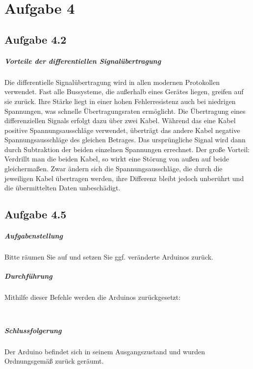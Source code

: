 \chapter{Aufgabe 4}
\section{Aufgabe 4.2}
\paragraph{Vorteile der differentiellen Signalübertragung}
Die differentielle Signalübertragung wird in allen modernen Protokollen verwendet. Fast alle Bussysteme, die außerhalb eines Gerätes liegen, greifen auf sie zurück. Ihre Stärke liegt in einer hohen Fehlerresistenz auch bei niedrigen Spannungen, was schnelle Übertragungsraten ermöglicht. Die Übertragung eines differenziellen Signals erfolgt dazu über zwei Kabel. Während das eine Kabel positive Spannungsausschläge verwendet, überträgt das andere Kabel negative Spannungsausschläge des gleichen Betrages. Das ursprüngliche Signal wird dann durch Subtraktion der beiden einzelnen Spannungen errechnet. Der große Vorteil: Verdrillt man die beiden Kabel, so wirkt eine Störung von außen auf beide gleichermaßen. Zwar ändern sich die Spannungsausschläge, die durch die jeweiligen Kabel übertragen werden, ihre Differenz bleibt jedoch unberührt und die übermittelten Daten unbeschädigt.




\section{Aufgabe 4.5}
\paragraph{Aufgabenstellung}
Bitte räumen Sie auf und setzen Sie ggf. veränderte Arduinos zurück.

\paragraph{Durchführung}
Mithilfe dieser Befehle werden die Arduinos zurückgesetzt:

\inputminted[breaklines, fontsize=\fontsize{10pt}{10pt}]{bash}{../docs/reset-dmx.txt}
\inputminted[breaklines, fontsize=\fontsize{10pt}{10pt}]{bash}{../docs/reset-rs323.txt}

\paragraph{Schlussfolgerung}
Der Arduino befindet sich in seinem Ausgangszustand und wurden Ordnungsgemäß zurück geräumt.